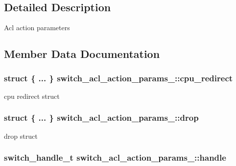 \subsection{Detailed Description}
Acl action parameters 

\subsection{Member Data Documentation}
\hypertarget{unionswitch__acl__action__params___a7177ef54f4154591f0e59cf51864d829}{
\subsubsection[{cpu\+\_\+redirect}]{\setlength{\rightskip}{0pt plus 5cm}struct \{ ... \}   switch\+\_\+acl\+\_\+action\+\_\+params\+\_\+\+::cpu\+\_\+redirect}}\label{unionswitch__acl__action__params___a7177ef54f4154591f0e59cf51864d829}
cpu redirect struct \hypertarget{unionswitch__acl__action__params___a45e7416e8f297c7dccf551696e3ec288}{
\subsubsection[{drop}]{\setlength{\rightskip}{0pt plus 5cm}struct \{ ... \}   switch\+\_\+acl\+\_\+action\+\_\+params\+\_\+\+::drop}}\label{unionswitch__acl__action__params___a45e7416e8f297c7dccf551696e3ec288}
drop struct \hypertarget{unionswitch__acl__action__params___aff254c1d3699f3f12fef4677e41fe952}{
\subsubsection[{handle}]{\setlength{\rightskip}{0pt plus 5cm}switch\+\_\+handle\+\_\+t switch\+\_\+acl\+\_\+action\+\_\+params\+\_\+\+::handle}}\label{unionswitch__acl__action__params___aff254c1d3699f3f12fef4677e41fe952}
